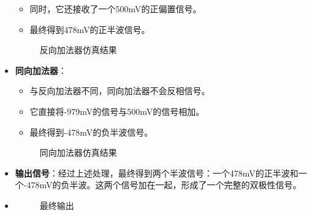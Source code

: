 \documentclass[UTF8,titlepage,a4paper]{ctexart}
\numberwithin{figure}{section}
\begin{document}
\begin{itemize}
\begin{itemize}
        \item 同时，它还接收了一个500mV的正偏置信号。
        \item 最终得到478mV的正半波信号。
    \end{itemize}
    \begin{figure}[H]
        \centering
         \caption{反向加法器仿真结果}
         \label{}
        \end{figure}

    \item \textbf{同向加法器}：
    \begin{itemize}
        \item 与反向加法器不同，同向加法器不会反相信号。
        \item 它直接将-979mV的信号与500mV的信号相加。
        \item 最终得到-478mV的负半波信号。
    \end{itemize}
    \begin{figure}[H]
        \centering
         \caption{同向加法器仿真结果}
         \label{}
        \end{figure}
    \item \textbf{输出信号}：经过上述处理，最终得到两个半波信号：一个478mV的正半波和一个-478mV的负半波。这两个信号加在一起，形成了一个完整的双极性信号。
    \item \begin{figure}[H]
        \centering
         \caption{最终输出}
         \label{}
        \end{figure}
\end{itemize}


\end{document}
